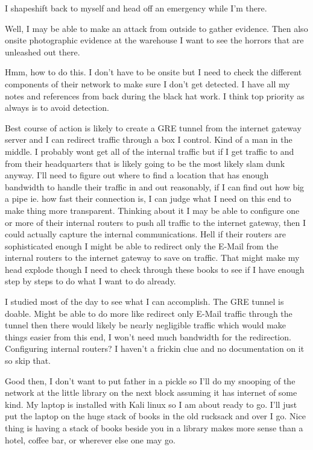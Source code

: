 I shapeshift back to myself and head off an emergency while I'm there. 

Well, I may be able to make an attack from outside to gather evidence. Then also onsite photographic evidence at the warehouse I want to see the horrors that are unleashed out there.

Hmm, how to do this. I don't have to be onsite but I need to check the different components of their network to make sure I don't get detected. I have all my notes and references from back during the black hat work. I think top priority as always is to avoid detection. 

Best course of action is likely to create a GRE tunnel from the internet gateway server and I can redirect traffic through a box I control. Kind of a man in the middle. I probably wont get all of the internal traffic but if I get traffic to and from their headquarters that is likely going to be the most likely slam dunk anyway. I'll need to figure out where to find a location that has enough bandwidth to handle their traffic in and out reasonably, if I can find out how big a pipe ie. how fast their connection is, I can judge what I need on this end to make thing more transparent. Thinking about it I may be able to configure one or more of their internal routers to push all traffic to the internet gateway, then I could actually capture the internal communications. Hell if their routers are sophisticated enough I might be able to redirect only the E-Mail from the internal routers to the internet gateway to save on traffic. That might make my head explode though I need to check through these books to see if I have enough step by steps to do what I want to do already.

I studied most of the day to see what I can accomplish. The GRE tunnel is doable. Might be able to do more like redirect only E-Mail traffic through the tunnel then there would likely be nearly negligible traffic which would make things easier from this end, I won't need much bandwidth for the redirection. Configuring internal routers? I haven't a frickin clue and no documentation on it so skip that.

Good then, I don't want to put father in a pickle so I'll do my snooping of the network at the little library on the next block assuming it has internet of some kind. My laptop is installed with Kali linux so I am about ready to go. I'll just put the laptop on the huge stack of books in the old rucksack and over I go. Nice thing is having a stack of books beside you in a library makes more sense than a hotel, coffee bar, or wherever else one may go.

